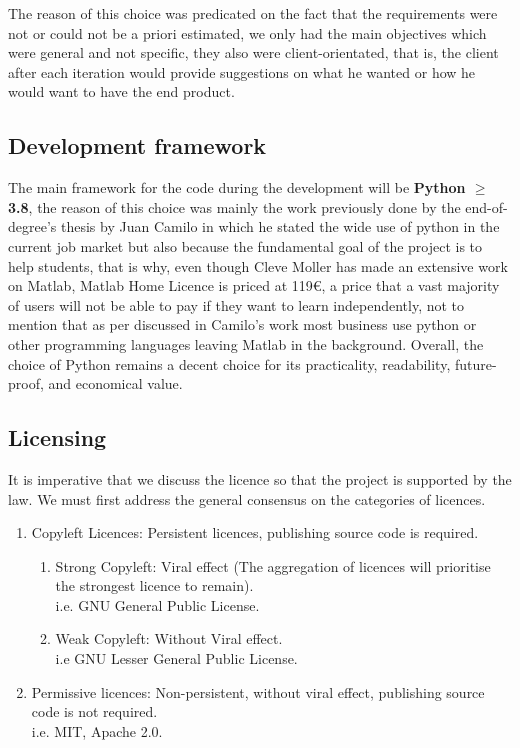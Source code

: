 The reason of this choice was predicated on the fact that the requirements were not or could not be a priori estimated, we only had the main objectives which were general and not specific, they also were client-orientated, that is, the client after each iteration would provide suggestions on what he wanted or how he would want to have the end product.

\subsection{Development framework}
The main framework for the code during the development will be \textbf{Python $\ge$ 3.8}, the reason of this choice was mainly the work previously done by the end-of-degree's thesis by Juan Camilo in which he stated the wide use of python in the current job market but also because the fundamental goal of the project is to help students, that is why, even though Cleve Moller has made an extensive work on Matlab, Matlab Home Licence is priced at 119€, a price that a vast majority of users will not be able to pay if they want to learn independently, not to mention that as per discussed in Camilo's work most business use python or other programming languages leaving Matlab in the background. Overall, the choice of Python remains a decent choice for its practicality, readability, future-proof, and economical value.

\subsection{Licensing}
It is imperative that we discuss the licence so that the project is supported by the law. We must first address the general consensus on the categories of licences.
\begin{enumerate}
    \item Copyleft Licences: Persistent licences, publishing source code is required.
        \begin{enumerate}
            \item Strong Copyleft: Viral effect (The aggregation of licences will prioritise the strongest licence to remain).\\
            i.e. GNU General Public License.
            \item Weak Copyleft: Without Viral effect.\\
            i.e GNU Lesser General Public License.
        \end{enumerate}
    \item Permissive licences: Non-persistent, without viral effect, publishing source code is not required.\\
    i.e. MIT, Apache 2.0.
\end{enumerate}

